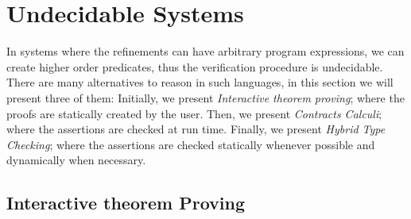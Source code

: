 \newcommand\labelcolor{OliveGreen}


\newcommand\trefc[4]{
\ensuremath{
  \langle
	\texttt{\{#1:} #2  \texttt{|} #3 \texttt{\}}
  \rangle
	^{\color{\labelcolor}#4}
}}

\newcommand\mklabel[1]{\color{\labelcolor}{#1}}


\newcommand\trefint[2]{\trefc{v}{{\color{colorint}\texttt{Int}}}{#1}{#2}}
\newcommand\trefpos[1]{\trefint{v>0}{#1}}

\newcommand\tyint{{\color{colorint}\texttt{Int}}}
\newcommand\ttpos{
\texttt{\{v:{\color{colorint}Int}|v > 0\}}
}

\newcommand\ttpred[1]{
\texttt{\{v:{\color{colorint}Int}|v = #1 - 1\}}
}

\newcommand\tteq[1]{
\texttt{\{v:{\color{colorint}Int}|v = #1\}}
}

\newcommand\tlabel{T-Label}
\newcommand\tcast{T-Cast}

\newcommand\cbase{C-Base}
\newcommand\cfunction{C-Fun}


\newcommand\predname{{\color{blue}\texttt{pred}}}
\newcommand\prednamep{{\color{blue}\texttt{pred'}}}

\newcommand\elabel[1]{\ensuremath{\Uparrow \mklabel{#1}}}
\newcommand\ecast[3]{\ensuremath{\langle #1 \Rightarrow #2 \rangle^{\mklabel{#3}}}}

\newcommand\isCompatible[2]{\ensuremath{ #1 \Vert #2 }}

\section{Undecidable Systems}\label{sec:undec}

In systems where the refinements can have arbitrary program expressions,
we can create higher order predicates, thus the verification procedure is undecidable.
%
There are many alternatives to reason in such languages, 
in this section we will present three of them:
Initially, we present \textit{Interactive theorem proving};
where the proofs are statically created by the user.
Then, we present \textit{Contracts Calculi}; 
where the assertions are checked at run time.
Finally, we present \textit{Hybrid Type Checking}; 
where the assertions are checked statically whenever possible
and dynamically when necessary.



\subsection{Interactive theorem Proving}

